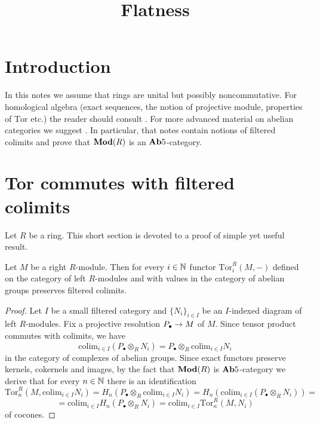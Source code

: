 



\title{Flatness}
\date{}
\maketitle
\section{Introduction}
\noindent
In this notes we assume that rings are unital but possibly noncommutative. For homological algebra (exact sequences, the notion of projective module, properties of $\mathrm{Tor}$ etc.) the reader should consult \cite{weibel1995introduction}. For more advanced material on abelian categories we suggest \cite{AbelianCategoriesresults}. In particular, that notes contain notions of filtered colimits and prove that $\mathbf{Mod}(R)$ is an $\mathbf{Ab}5$-category.

\section{Tor commutes with filtered colimits}
Let $R$ be a ring. This short section is devoted to a proof of simple yet useful result.


\begin{proposition}\label{proposition:torpreservesfiltered}
Let $M$ be a right $R$-module. Then for every $i\in {\mathbb N}$ functor $\mathrm{Tor}^R_i(M,-)$ defined on the category of left $R$-modules and with values in the category of abelian groups preserves filtered colimits.
\end{proposition}
\begin{proof}
Let $I$ be a small filtered category and $\{N_i\}_{i\in I}$ be an $I$-indexed diagram of left $R$-modules. Fix a projective resolution $P_{\bullet}\rightarrow M$ of $M$. Since tensor product commutes with colimits, we have 
$$\mathrm{colim}_{i\in I}\left(P_{\bullet}\otimes_RN_i\right)=P_{\bullet}\otimes_R\mathrm{colim}_{i\in I}N_i$$
in the category of complexes of abelian groups. Since exact functors preserve kernels, cokernels and images, by the fact that $\mathbf{Mod}(R)$ is $\mathbf{Ab}5$-category we derive that for every $n\in {\mathbb N}$ there is an identification
$$\mathrm{Tor}^R_n\left(M,\mathrm{colim}_{i\in I}N_i\right)=H_n\left(P_{\bullet}\otimes_R\mathrm{colim}_{i\in I}N_i\right)=H_n\left(\mathrm{colim}_{i\in I}\left(P_{\bullet}\otimes_RN_i\right)\right)=$$
$$=\mathrm{colim}_{i\in I}H_n\left(P_{\bullet}\otimes_RN_i\right)=\mathrm{colim}_{i\in I}\mathrm{Tor}^R_n\left(M,N_i\right)$$
of cocones.
\end{proof}

